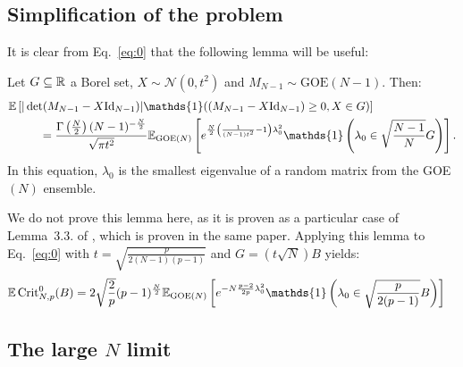 \documentclass[amsmath,amssymb,nofootinbib,prd]{article}
\begin{document}
	\subsection{Simplification of the problem}
	
	It is clear from Eq.~\ref{eq:0} that the following lemma will be useful:
	\begin{lemma}\label{lemma:simplification} Let $G \subseteq \mathbb{R}$ a Borel set, $X \sim \mathcal{N}(0,t^2)$ and $M_{N-1} \sim \mathrm{GOE}(N-1)$. Then:
	\begin{align}
	\EE &\left[|\det (M_{N-1} - X \mathrm{Id}_{N-1})| \mathds{1}( (M_{N-1} - X \mathrm{Id}_{N-1}) \geq 0, X \in G)\right] \nonumber \\
	&\qquad = \frac{\Gamma\left(\frac{N}{2}\right)(N-1)^{-\frac{N}{2}}}{\sqrt{\pi t^2}} \EE_{\mathrm{GOE}(N)} \left[e^{\frac{N}{2}\left(\frac{1}{(N-1)t^2} - 1\right) \lambda_0^2} \mathds{1} \left(\lambda_0 \in \sqrt{\frac{N-1}{N}} G\right)\right].
	\end{align}
	In this equation, $\lambda_0$ is the smallest eigenvalue of a random matrix from the GOE$(N)$ ensemble. 
	\end{lemma}

	We do not prove this lemma here, as it is proven as a particular case of Lemma~3.3. of \cite{auffinger2013random}, which is proven in the same paper. Applying this lemma to Eq.~\ref{eq:0} with $t = \sqrt{\frac{p}{2 (N-1)(p-1)}}$ and  $G = (t\sqrt{N}) B$ yields:
	\begin{align}\label{eq:1}
	\EE \, \mathrm{Crit}_{N,p}^0(B) &= 2 \sqrt{\frac{2}{p}} (p-1)^{\frac{N}{2}} \EE_{\mathrm{GOE}(N)} \left[e^{-N \frac{p-2}{2p} \lambda_0^2} \mathds{1} \left(\lambda_0 \in  \sqrt{\frac{p}{2(p-1)}} B\right)\right]
\end{align}		
	
	
	\subsection{The large $N$ limit}
	
\end{document}
